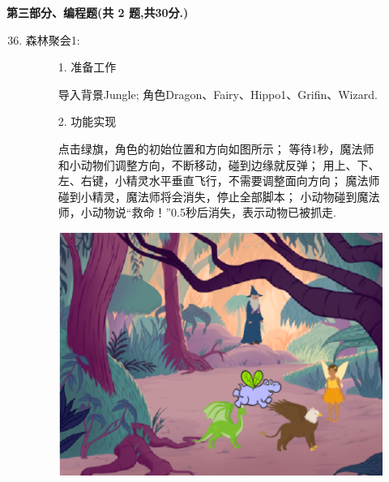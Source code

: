 \documentclass[10pt, a4paper]{article}
\begin{document}
    \newpage
    {\noindent \textbf{第三部分、编程题(共 2 题,共30分.)}}
    \begin{enumerate}
        \setcounter{enumi}{35}
        
        \item 森林聚会1:
        \begin{figure}[htbp]
            \begin{minipage}{.6\textwidth}
                1. 准备工作
                \begin{tasks}[label = (\arabic*)]
                    \task 导入背景Jungle;
                    \task 角色Dragon、Fairy、Hippo1、Grifin、Wizard.
                \end{tasks}
                2. 功能实现
                \begin{tasks}[label = (\arabic*)]
                    \task 点击绿旗，角色的初始位置和方向如图所示；
                    \task 等待1秒，魔法师和小动物们调整方向，不断移动，碰到边缘就反弹；
                    \task 用上、下、左、右键，小精灵水平垂直飞行，不需要调整面向方向；
                    魔法师碰到小精灵，魔法师将会消失，停止全部脚本；
                    \task 小动物碰到魔法师，小动物说“救命！”0.5秒后消失，表示动物已被抓走.
                \end{tasks}
            \end{minipage}
            \begin{minipage}{.37\textwidth}
                \centering
                \includegraphics[width=\textwidth]{36.png}
            \end{minipage}
        \end{figure}


\end{enumerate}
\end{document}
